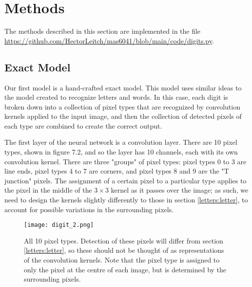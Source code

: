 \documentclass{somasmsc}
\begin{document}
\section{Methods}

The methods described in this section are implemented in the file \url{https://github.com/HectorLeitch/mas6041/blob/main/code/digits.py}.

\subsection{Exact Model}

Our first model is a hand-crafted exact model. This model uses similar ideas to the model created to recognize letters and words. In this case, each digit is broken down into a collection of pixel types that are recognized by convolution kernels applied to the input image, and then the collection of detected pixels of each type are combined to create the correct output.

The first layer of the neural network is a convolution layer. There are 10 pixel types, shown in figure 7.2, and so the layer has 10 channels, each with its own convolution kernel. There are three "groups" of pixel types: pixel types 0 to 3 are line ends, pixel types 4 to 7 are corners, and pixel types 8 and 9 are the "T junction" pixels. The assignment of a certain pixel to a particular type applies to the pixel in the middle of the $3 \times 3$ kernel as it passes over the image; as such, we need to design the kernels slightly differently to those in section \ref{letters:letter}, to account for possible variations in the surrounding pixels.

\begin{figure}[H]\label{digit:fig2}
\begin{center}
\texttt{[image: digit\_2.png]}
\end{center}
\caption{All 10 pixel types. Detection of these pixels will differ from section \ref{letters:letter}, so these should not be thought of as representations of the convolution kernels. Note that the pixel type is assigned to only the pixel at the centre of each image, but is determined by the surrounding pixels.}
\end{figure}
\end{document}
